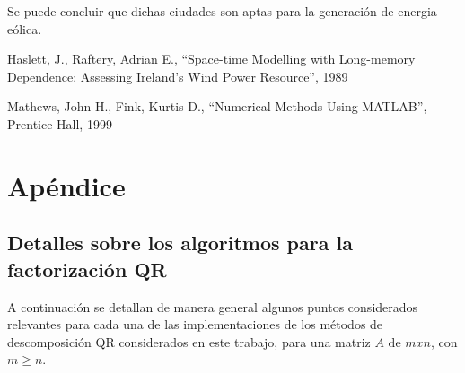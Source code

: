 \documentclass[journal, monochrome]{IEEEtran}
\begin{document}
Se puede concluir que dichas ciudades son aptas para la generación de energia eólica.



\vspace{1cm}
\begin{thebibliography}{1}
	Haslett, J.,
	Raftery, Adrian E.,
	``Space-time Modelling with
   	Long-memory Dependence: Assessing Ireland's Wind Power Resource'',
	1989 

	Mathews, John H.,
	Fink, Kurtis D.,
	``Numerical Methods Using MATLAB'',
	Prentice Hall,
	1999
	
\end{thebibliography}




\clearpage
\section{Apéndice}
\vspace{0.5cm}
\subsection{Detalles sobre los algoritmos para la factorización QR}
\par
A continuación se detallan de manera general algunos puntos considerados relevantes para cada una de las implementaciones de los métodos de descomposición QR considerados en este trabajo, para una matriz $A$ de $mxn$, con $m \geq n$.

\vspace{0.5cm}
\end{document}
